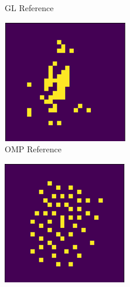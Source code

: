 \documentclass[a4paper,twocolumn]{article} %
\begin{document}
\begin{figure}[h!]
\begin{subfigure}[t]{0.19\linewidth}
        \caption*{GL Reference}
    \end{subfigure}
    \hfill
    \begin{subfigure}[t]{0.19\linewidth}
        \includegraphics[width=\linewidth]{figures/reference_features_omp.png}
        \caption*{OMP Reference}
    \end{subfigure}
    \hfill
    \begin{subfigure}[t]{0.19\linewidth}
        \includegraphics[width=\linewidth]{figures/reference_features_seql.png}

\end{subfigure}
\end{figure}
\end{document}

